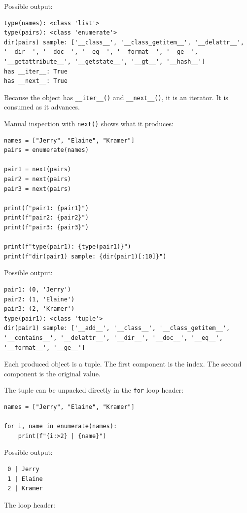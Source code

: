 Possible output:

\begin{verbatim}
type(names): <class 'list'>
type(pairs): <class 'enumerate'>
dir(pairs) sample: ['__class__', '__class_getitem__', '__delattr__',
'__dir__', '__doc__', '__eq__', '__format__', '__ge__',
'__getattribute__', '__getstate__', '__gt__', '__hash__']
has __iter__: True
has __next__: True
\end{verbatim}

Because the object has \texttt{\_\_iter\_\_()} and \texttt{\_\_next\_\_()}, it is an iterator. It is consumed as it advances.

Manual inspection with \texttt{next()} shows what it produces:

\begin{verbatim}
names = ["Jerry", "Elaine", "Kramer"]
pairs = enumerate(names)

pair1 = next(pairs)
pair2 = next(pairs)
pair3 = next(pairs)

print(f"pair1: {pair1}")
print(f"pair2: {pair2}")
print(f"pair3: {pair3}")

print(f"type(pair1): {type(pair1)}")
print(f"dir(pair1) sample: {dir(pair1)[:10]}")
\end{verbatim}

Possible output:

\begin{verbatim}
pair1: (0, 'Jerry')
pair2: (1, 'Elaine')
pair3: (2, 'Kramer')
type(pair1): <class 'tuple'>
dir(pair1) sample: ['__add__', '__class__', '__class_getitem__',
'__contains__', '__delattr__', '__dir__', '__doc__', '__eq__',
'__format__', '__ge__']
\end{verbatim}

Each produced object is a tuple. The first component is the index. The second component is the original value.

The tuple can be unpacked directly in the \texttt{for} loop header:

\begin{verbatim}
names = ["Jerry", "Elaine", "Kramer"]

for i, name in enumerate(names):
    print(f"{i:>2} | {name}")
\end{verbatim}

Possible output:

\begin{verbatim}
 0 | Jerry
 1 | Elaine
 2 | Kramer
\end{verbatim}

The loop header:

